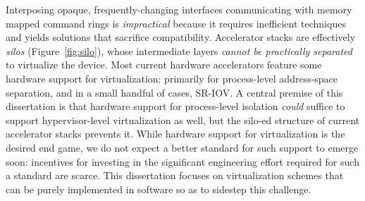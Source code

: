Interposing opaque, frequently-changing interfaces communicating with memory
mapped command rings is \emph{impractical} because it requires inefficient
techniques and yields solutions that sacrifice compatibility.
Accelerator stacks are effectively \emph{silos} (Figure~\ref{fig:silo}), whose
intermediate layers \emph{cannot be practically separated} to virtualize the
device. Most current hardware accelerators feature some hardware support for
virtualization: primarily for process-level address-space separation, and in a
small handful of cases, SR-IOV. A central premise of this dissertation is that
hardware support for process-level isolation \emph{could} suffice to support
hypervisor-level virtualization as well, but the silo-ed structure of current
accelerator stacks prevents it.
While hardware support for virtualization is the desired end game, we do not
expect a better standard for such support to emerge soon: incentives for
investing in the significant engineering effort required for such a standard
are scarce. This dissertation focuses on virtualization schemes that can be
purely implemented in software so as to sidestep this challenge.